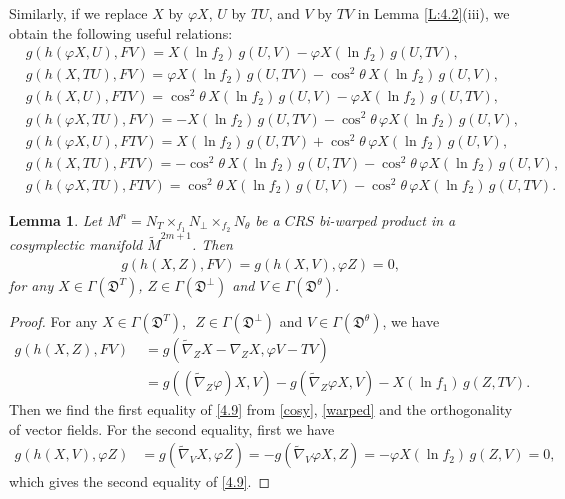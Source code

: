 \documentclass[reqno]{amsart}
\theoremstyle{plain}
\newtheorem{lemma}{Lemma}[section]
\theoremstyle{remark}
\numberwithin{equation}{section}
\def\e{\eqref}
\def\e{\eqref}
\begin{document}
Similarly, if we replace $X$ by $\varphi X$, $U$ by $TU$, and $V$ by $TV$ in Lemma \ref{L:4.2}(iii), we obtain the following useful relations:
 \begin{align}\label{4.2}
&g(h(\varphi X, U), FV)=X(\ln f_2)\,g(U, V)-\varphi X(\ln f_2)\,g(U, TV),
\\ \label{4.3}
&g(h(X,TU), FV)=\varphi X(\ln f_2)\,g(U, TV)-\cos^2\theta\,X(\ln f_2)\,g(U, V),
\\ &\label{4.4} g(h(X,U), FTV)=\cos^2\theta\,X(\ln f_2)\,g(U, V)-\varphi X(\ln f_2)\,g(U, TV),
\\&\label{4.5} g(h(\varphi X,TU), FV)=-X(\ln f_2)\,g(U, TV)-\cos^2\theta\,\varphi X(\ln f_2)\,g(U, V),
\\&\label{4.6} g(h(\varphi X, U), FTV)=X(\ln f_2)\,g(U, TV)+\cos^2\theta\,\varphi X(\ln f_2)\,g(U, V),
\\ \label{4.7} &g(h(X, TU), FTV)=-\cos^2\theta\,X(\ln f_2)\,g(U, TV)-\cos^2\theta\,\varphi X(\ln f_2)\,g(U, V),
\\&\label{4.8} g(h(\varphi X, TU), FTV)=\cos^2\theta\,X(\ln f_2)\,g(U, V)-\cos^2\theta\,\varphi X(\ln f_2)\,g(U, TV).
\end{align}


\begin{lemma}\label{L:4.3} Let $M^n=N_T\times_{f_1}N_\perp\times_{f_2}N_\theta$ be a $CRS$ bi-warped product in a cosymplectic manifold $\widetilde M^{2m+1}$. Then \begin{align}\label{4.9}
g(h(X, Z),FV)=g(h(X, V), \varphi Z)=0,\end{align}
for any $X\in \Gamma({\mathfrak{D}^{T}})$, $Z\in \Gamma({\mathfrak{D}}^\perp)$ and $V\in \Gamma({\mathfrak{D}}^\theta)$.
\end{lemma}
 \begin{proof} For any $X\in \Gamma({\mathfrak{D}^{T}})$,\,\, $Z\in \Gamma({\mathfrak{D}}^\perp)$ and $V\in \Gamma({\mathfrak{D}}^\theta)$, we have
\begin{equation*} \begin{aligned}
g(h(X, Z), FV)\;&=g(\widetilde{\nabla}_ZX-\nabla_ZX, \varphi V-TV)\\&=g((\widetilde{\nabla}_{Z}\varphi)X, V) -g(\widetilde\nabla_{Z}\varphi X, V)-X(\ln f_1)\,g(Z, TV).
\end{aligned}\end{equation*}
Then we find the first equality of \eqref{4.9} from \eqref{cosy}, \e{warped} and the orthogonality of vector fields. 
For the second equality, first we have
 \begin{align*}
g(h(X, V), \varphi Z)&=g(\widetilde{\nabla}_VX, \varphi Z)=-g(\widetilde\nabla_V\varphi X, Z)=-\varphi X(\ln f_2)\,g(Z, V)=0,
\end{align*}
which gives the second equality of \eqref{4.9}. 
 \end{proof}
 
\end{document}
